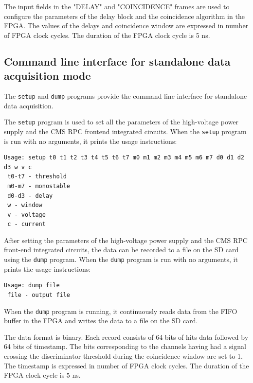 \documentclass[12pt, a4paper]{article}
\begin{document}
The input fields in the "DELAY" and "COINCIDENCE" frames are used to configure the parameters of the delay block and the coincidence algorithm in the FPGA. The values of the delays and coincidence window are expressed in number of FPGA clock cycles. The duration of the FPGA clock cycle is 5 ns.

\subsection{Command line interface for standalone data acquisition mode}

The \texttt{setup} and \texttt{dump} programs provide the command line interface for standalone data acquisition.

The \texttt{setup} program is used to set all the parameters of the high-voltage power supply and the CMS RPC frontend integrated circuits. When the \texttt{setup} program is run with no arguments, it prints the usage instructions:
\vspace{-1ex}
\begin{verbatim}
Usage: setup t0 t1 t2 t3 t4 t5 t6 t7 m0 m1 m2 m3 m4 m5 m6 m7 d0 d1 d2 d3 w v c
 t0-t7 - threshold
 m0-m7 - monostable
 d0-d3 - delay
 w - window
 v - voltage
 c - current
\end{verbatim}

After setting the parameters of the high-voltage power supply and the CMS RPC front-end integrated circuits, the data can be recorded to a file on the SD card using the \texttt{dump} program. When the \texttt{dump} program is run with no arguments, it prints the usage instructions:
\vspace{-1ex}
\begin{verbatim}
Usage: dump file
 file - output file
\end{verbatim}

When the \texttt{dump} program is running, it continuously reads data from the FIFO buffer in the FPGA and writes the data to a file on the SD card.

The data format is binary. Each record consists of 64 bits of hits data followed by 64 bits of timestamp. The bits corresponding to the channels having had a signal crossing the discriminator threshold during the coincidence window are set to 1. The timestamp is expressed in number of FPGA clock cycles. The duration of the FPGA clock cycle is 5 ns.
\end{document}
